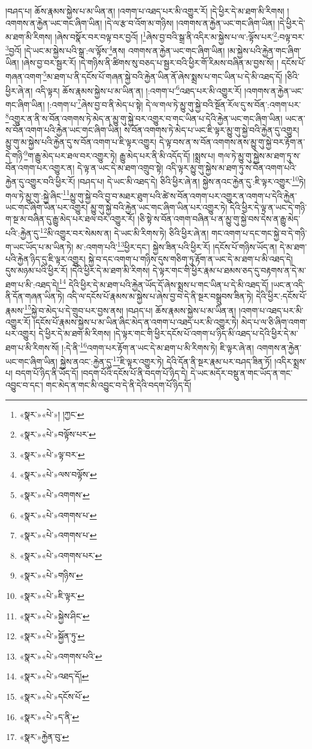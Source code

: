 །བཤད་པ། ཆོས་རྣམས་སྐྱེས་པ་མ་ཡིན་ན། །འགག་པ་འཐད་པར་མི་འགྱུར་རོ། །དེ་ཕྱིར་དེ་མ་ཐག་མི་རིགས། །འགགས་ན་རྐྱེན་ཡང་གང་ཞིག་ཡིན། །དེ་ལ་རྩ་བ་འོག་མ་གཉིས། །འགགས་ན་རྐྱེན་ཡང་གང་ཞིག་ཡིན། །དེ་ཕྱིར་དེ་མ་ཐག་མི་རིགས། །ཞེས་བསྣོར་བར་བལྟ་བར་བྱའོ། །\footnote{«སྣར་»«པེ་»། །ཀྱང་}ཞེས་བྱ་བའི་སྒྲ་ནི་འདིར་མ་སྐྱེས་པ་ལ་:ལྟོས་པར་\footnote{«སྣར་»«པེ་»བལྟོས་པར་}:བལྟ་བར་\footnote{«སྣར་»«པེ་»ལྟ་བར་}བྱའོ། །དེ་ཡང་མ་སྐྱེས་པའི་སྒྲ་:ལ་ལྟོས་\footnote{«སྣར་»«པེ་»ལས་བལྟོས་}ནས། འགགས་ན་རྐྱེན་ཡང་གང་ཞིག་ཡིན། །མ་སྐྱེས་པའི་རྐྱེན་གང་ཞིག་ཡིན། །ཞེས་བྱ་བར་སྦྱར་རོ། །དེ་གཉིས་ནི་ཚིགས་སུ་བཅད་པ་སྦྱར་བའི་ཕྱིར་གོ་རིམས་བཞིན་མ་བྱས་སོ། །
དངོས་པོ་གཞན་འགག་\footnote{«སྣར་»«པེ་»འགགས་}མ་ཐག་པ་ནི་དངོས་པོ་གཞན་སྐྱེ་བའི་རྐྱེན་ཡིན་ནོ་ཞེས་སྨྲས་པ་གང་ཡིན་པ་དེ་མི་འཐད་དོ། །ཅིའི་ཕྱིར་ཞེ་ན། འདི་ལྟར། ཆོས་རྣམས་སྐྱེས་པ་མ་ཡིན་ན། །:འགག་པ་\footnote{«སྣར་»«པེ་»འགགས་པ་}འཐད་པར་མི་འགྱུར་རོ། །འགགས་ན་རྐྱེན་ཡང་གང་ཞིག་ཡིན། །:འགག་པ་\footnote{«སྣར་»«པེ་»འགགས་པ་}ཞེས་བྱ་བ་ནི་མེད་པ་སྟེ། དེ་ལ་གལ་ཏེ་མྱུ་གུ་སྐྱེ་བའི་སྔོན་རོལ་དུ་ས་བོན་:འགག་པར་\footnote{«སྣར་»«པེ་»འགགས་པར་}འགྱུར་ན་ནི་ས་བོན་འགགས་ཏེ་མེད་ན་མྱུ་གུ་སྐྱེ་བར་འགྱུར་བ་གང་ཡིན་པ་དེའི་རྐྱེན་ཡང་གང་ཞིག་ཡིན། ཡང་ན་ས་བོན་འགག་པའི་རྐྱེན་ཡང་གང་ཞིག་ཡིན། ས་བོན་འགགས་ཏེ་མེད་པ་ཡང་ཇི་ལྟར་མྱུ་གུ་སྐྱེ་བའི་རྐྱེན་དུ་འགྱུར། མྱུ་གུ་མ་སྐྱེས་པའི་རྐྱེན་དུ་ས་བོན་འགག་པ་ཇི་ལྟར་འགྱུར། དེ་ལྟ་བས་ན་ས་བོན་འགགས་ནས་མྱུ་གུ་སྐྱེ་བར་རྟོག་ན་དེ་གཉི་\footnote{«སྣར་»«པེ་»གཉིས་}ག་རྒྱུ་མེད་པར་ཐལ་བར་འགྱུར་ཏེ། རྒྱུ་མེད་པར་ནི་མི་འདོད་དོ། །སྨྲས་པ། གལ་ཏེ་མྱུ་གུ་སྐྱེས་མ་ཐག་ཏུ་ས་བོན་འགག་པར་འགྱུར་ན། དེ་ལྟ་ན་ཡང་དེ་མ་ཐག་འགྲུབ་སྟེ། འདི་ལྟར་མྱུ་གུ་སྐྱེས་མ་ཐག་ཏུ་ས་བོན་འགག་པའི་རྐྱེན་དུ་འགྱུར་བའི་ཕྱིར་རོ། །བཤད་པ། དེ་ཡང་མི་འཐད་དེ། ཅིའི་ཕྱིར་ཞེ་ན། སྐྱེས་ནའང་རྐྱེན་དུ་:ཇི་ལྟར་འགྱུར་\footnote{«སྣར་»«པེ་»ཇི་ལྟར་}ཏེ། གལ་ཏེ་མྱུ་གུ་:སྐྱེ་ཞིང་\footnote{«སྣར་»«པེ་»སྐྱེས་ཤིང་}མྱུ་གུ་སྐྱེ་བའི་བྱ་བ་མཐར་ཐུག་པའི་ཚེ་ས་བོན་འགག་པར་འགྱུར་ན་འགག་པ་དེའི་རྐྱེན་ཡང་གང་ཞིག་ཡིན་པར་འགྱུར། མྱུ་གུ་སྐྱེ་བའི་རྐྱེན་ཡང་གང་ཞིག་ཡིན་པར་འགྱུར་ཏེ། དེའི་ཕྱིར་དེ་ལྟ་ན་ཡང་དེ་གཉི་ག་སྔ་མ་བཞིན་དུ་རྒྱུ་མེད་པར་ཐལ་བར་འགྱུར་རོ། །ཅི་སྟེ་ས་བོན་འགག་བཞིན་པ་ན་མྱུ་གུ་སྐྱེ་བས་དེས་ན་རྒྱུ་མེད་པའི་:རྐྱེན་དུ་\footnote{«སྣར་»«པེ་»སྐྱོན་ཏུ་}མི་འགྱུར་བར་སེམས་ན། དེ་ཡང་མི་རིགས་ཏེ། ཅིའི་ཕྱིར་ཞེ་ན། གང་འགག་པ་དང་གང་སྐྱེ་བ་དེ་གཉི་ག་ཡང་ཡོད་པ་མ་ཡིན་ཏེ། མ་:འགག་པའི་\footnote{«སྣར་»«པེ་»འགགས་པའི་}ཕྱིར་དང་། སྐྱེས་ཟིན་པའི་ཕྱིར་རོ། །དངོས་པོ་གཉིས་ཡོད་ན། དེ་མ་ཐག་པའི་རྐྱེན་ཉིད་དུ་ཇི་ལྟར་འགྱུར། སྐྱེ་བ་དང་འགག་པ་གཉིས་དུས་གཅིག་ཏུ་རྟོག་ན་ཡང་དེ་མ་ཐག་པ་མི་འཐད་དེ། དུས་མཉམ་པའི་ཕྱིར་རོ། །དེའི་ཕྱིར་དེ་མ་ཐག་མི་རིགས། དེ་ལྟར་གང་གི་ཕྱིར་རྣམ་པ་ཐམས་ཅད་དུ་བརྟགས་ན་དེ་མ་ཐག་པ་མི་:འཐད་དེ།\footnote{«སྣར་»«པེ་»འཐད་དོ།} དེའི་ཕྱིར་དེ་མ་ཐག་པའི་རྐྱེན་ཡོད་དོ་ཞེས་སྨྲས་པ་གང་ཡིན་པ་དེ་མི་འཐད་དོ། །ཡང་ན་འདི་ནི་དོན་གཞན་ཡིན་ཏེ། འདི་ལ་དངོས་པོ་རྣམས་མ་སྐྱེས་པ་ཞེས་བྱ་བ་དེ་ནི་སྔར་བསྒྲུབས་ཟིན་ཏེ། དེའི་ཕྱིར་:དངོས་པོ་རྣམས་\footnote{«སྣར་»«པེ་»དངོས་པོ་}སྐྱེ་བ་མེད་པ་དེ་གྲུབ་པར་བྱས་ནས། །བཤད་པ། ཆོས་རྣམས་སྐྱེས་པ་མ་ཡིན་ན། །འགག་པ་འཐད་པར་མི་འགྱུར་རོ། །དངོས་པོ་རྣམས་སྐྱེས་པ་མ་ཡིན་ཞིང་མེད་ན་འགག་པ་འཐད་པར་མི་འགྱུར་ཏེ། མེད་པ་ལ་ཅི་ཞིག་འགག་པར་འགྱུར། དེ་ཕྱིར་དེ་མ་ཐག་མི་རིགས། །དེ་ལྟར་གང་གི་ཕྱིར་དངོས་པོ་འགག་པ་ཉིད་མི་འཐད་པ་དེའི་ཕྱིར་དེ་མ་ཐག་པ་མི་རིགས་སོ། །:དེ་ནི་\footnote{«སྣར་»«པེ་»ད་ནི་}འགག་པར་རྟོག་ན་ཡང་དེ་མ་ཐག་པ་མི་རིགས་ཏེ། ཇི་ལྟར་ཞེ་ན། འགགས་ན་རྐྱེན་ཡང་གང་ཞིག་ཡིན། སྐྱེས་ནའང་:རྐྱེན་དུ་\footnote{«སྣར་»རྐྱེན་བུ་}ཇི་ལྟར་འགྱུར་ཏེ། དེའི་དོན་ནི་སྔར་རྣམ་པར་བཤད་ཟིན་ཏོ། །འདིར་སྨྲས་པ། བདག་པོ་ཉིད་ནི་ཡོད་དོ། །བདག་པོའི་དངོས་པོ་ནི་བདག་པོ་ཉིད་དེ། དེ་ཡང་མདོར་བསྡུ་ན་གང་ཡོད་ན་གང་འབྱུང་བ་དང་། གང་མེད་ན་གང་མི་འབྱུང་བ་དེ་ནི་དེའི་བདག་པོ་ཉིད་དོ། 